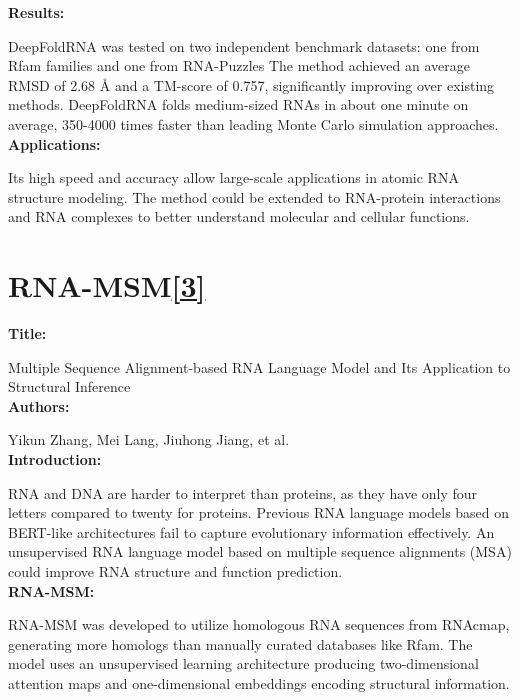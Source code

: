 \documentclass{article}
\begin{document}
\begin{large}
\begin{large}
\begin{large}
\textbf{Results:}\par

DeepFoldRNA was tested on two independent benchmark datasets: one from Rfam families and one from RNA-Puzzles
The method achieved an average RMSD of 2.68 Å and a TM-score of 0.757, significantly improving over existing methods.
DeepFoldRNA folds medium-sized RNAs in about one minute on average, 350-4000 times faster than leading Monte Carlo simulation approaches.\\[0.5em]

\textbf{Applications:}\par

Its high speed and accuracy allow large-scale applications in atomic RNA structure modeling.
The method could be extended to RNA-protein interactions and RNA complexes to better understand molecular and cellular functions.\\[0.5em]

\clearpage

\section{RNA-MSM\href{https://doi.org/10.1093/nar/gkad1031}{\textbf{[3]}}}

\textbf{Title:}\par
Multiple Sequence Alignment-based RNA Language Model and Its Application to Structural Inference\\[0.5em]

\textbf{Authors:}\par
Yikun Zhang, Mei Lang, Jiuhong Jiang, et al.\\[0.5em]

\textbf{Introduction:}\par

RNA and DNA are harder to interpret than proteins, as they have only four letters compared to twenty for proteins.
Previous RNA language models based on BERT-like architectures fail to capture evolutionary information effectively.
An unsupervised RNA language model based on multiple sequence alignments (MSA) could improve RNA structure and function prediction.\\[0.5em]

\textbf{RNA-MSM:}\par

RNA-MSM was developed to utilize homologous RNA sequences from RNAcmap, generating more homologs than manually curated databases like Rfam.
The model uses an unsupervised learning architecture producing two-dimensional attention maps and one-dimensional embeddings encoding structural information.\\[0.5em]


\end{large}
\end{large}
\end{large}
\end{document}
